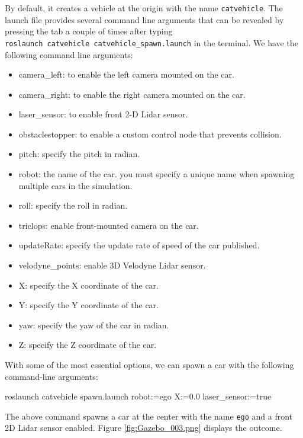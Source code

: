 \documentclass[
]{article}
\newenvironment{Shaded}{\begin{snugshade}}{\end{snugshade}}
\newcommand{\ExtensionTok}[1]{#1}
\newcommand{\NormalTok}[1]{#1}
\providecommand{\tightlist}{%
  \setlength{\itemsep}{0pt}\setlength{\parskip}{0pt}}
\begin{document}
By default, it creates a vehicle at the origin with the name
\texttt{catvehicle}. The launch file provides several command line
arguments that can be revealed by pressing the tab a couple of times
after typing \texttt{roslaunch\ catvehicle\ catvehicle\_spawn.launch} in
the terminal. We have the following command line arguments:

\begin{itemize}
\tightlist
\item
  camera\_left: to enable the left camera mounted on the car.
\item
  camera\_right: to enable the right camera mounted on the car.
\item
  laser\_sensor: to enable front 2-D Lidar sensor.
\item
  obstaclestopper: to enable a custom control node that prevents
  collision.
\item
  pitch: specify the pitch in radian.
\item
  robot: the name of the car. you must specify a unique name when
  spawning multiple cars in the simulation.
\item
  roll: specify the roll in radian.
\item
  triclops: enable front-mounted camera on the car.
\item
  updateRate: specify the update rate of speed of the car published.
\item
  velodyne\_points: enable 3D Velodyne Lidar sensor.
\item
  X: specify the X coordinate of the car.
\item
  Y: specify the Y coordinate of the car.
\item
  yaw: specify the yaw of the car in radian.
\item
  Z: specify the Z coordinate of the car.
\end{itemize}

With some of the most essential options, we can spawn a car with the
following command-line arguments:

\begin{Shaded}
\begin{Highlighting}[]
\ExtensionTok{roslaunch}\NormalTok{ catvehicle spawn.launch robot:=ego X:=0.0 laser\_sensor:=true}
\end{Highlighting}
\end{Shaded}

The above command spawns a car at the center with the name \texttt{ego}
and a front 2D Lidar sensor enabled. Figure \ref{fig:Gazebo_003.png}
displays the outcome.
\end{document}
